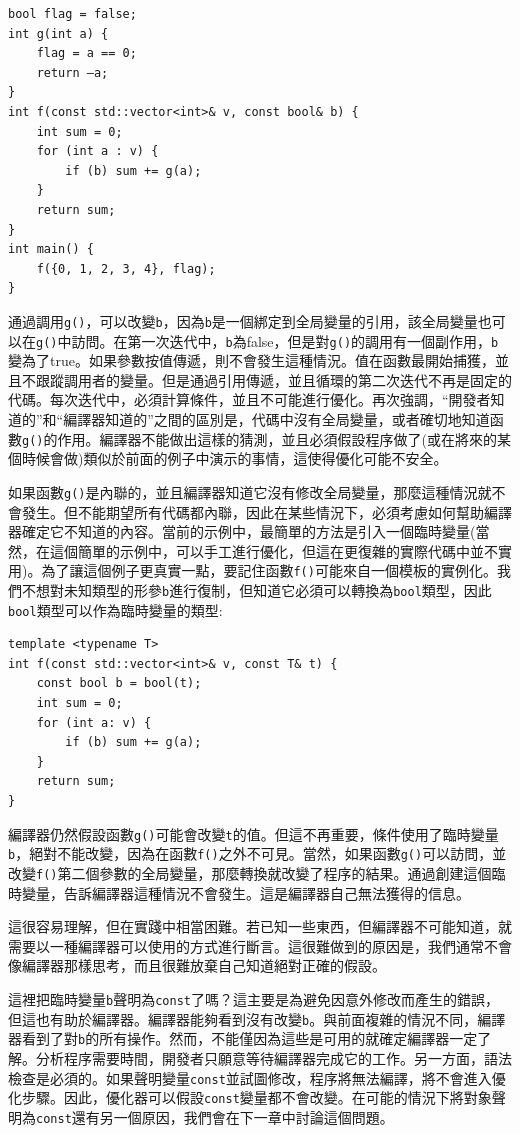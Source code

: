 \begin{lstlisting}[style=styleCXX]
bool flag = false;
int g(int a) {
	flag = a == 0;
	return –a;
}
int f(const std::vector<int>& v, const bool& b) {
	int sum = 0;
	for (int a : v) {
		if (b) sum += g(a);
	}
	return sum;
} 
int main() {
	f({0, 1, 2, 3, 4}, flag);
}
\end{lstlisting}

通過調用\texttt{g()}，可以改變\texttt{b}，因為\texttt{b}是一個綁定到全局變量的引用，該全局變量也可以在\texttt{g()}中訪問。在第一次迭代中，\texttt{b}為false，但是對\texttt{g()}的調用有一個副作用，\texttt{b}變為了true。如果參數按值傳遞，則不會發生這種情況。值在函數最開始捕獲，並且不跟蹤調用者的變量。但是通過引用傳遞，並且循環的第二次迭代不再是固定的代碼。每次迭代中，必須計算條件，並且不可能進行優化。再次強調，“開發者知道的”和“編譯器知道的”之間的區別是，代碼中沒有全局變量，或者確切地知道函數\texttt{g()}的作用。編譯器不能做出這樣的猜測，並且必須假設程序做了(或在將來的某個時候會做)類似於前面的例子中演示的事情，這使得優化可能不安全。 

如果函數\texttt{g()}是內聯的，並且編譯器知道它沒有修改全局變量，那麼這種情況就不會發生。但不能期望所有代碼都內聯，因此在某些情況下，必須考慮如何幫助編譯器確定它不知道的內容。當前的示例中，最簡單的方法是引入一個臨時變量(當然，在這個簡單的示例中，可以手工進行優化，但這在更復雜的實際代碼中並不實用)。為了讓這個例子更真實一點，要記住函數\texttt{f()}可能來自一個模板的實例化。我們不想對未知類型的形參\texttt{b}進行復制，但知道它必須可以轉換為\texttt{bool}類型，因此\texttt{bool}類型可以作為臨時變量的類型:

\begin{lstlisting}[style=styleCXX]
template <typename T>
int f(const std::vector<int>& v, const T& t) {
	const bool b = bool(t);
	int sum = 0;
	for (int a: v) {
		if (b) sum += g(a);
	}
	return sum;
}
\end{lstlisting}

編譯器仍然假設函數\texttt{g()}可能會改變\texttt{t}的值。但這不再重要，條件使用了臨時變量\texttt{b}，絕對不能改變，因為在函數\texttt{f()}之外不可見。當然，如果函數\texttt{g()}可以訪問，並改變\texttt{f()}第二個參數的全局變量，那麼轉換就改變了程序的結果。通過創建這個臨時變量，告訴編譯器這種情況不會發生。這是編譯器自己無法獲得的信息。 

這很容易理解，但在實踐中相當困難。若已知一些東西，但編譯器不可能知道，就需要以一種編譯器可以使用的方式進行斷言。這很難做到的原因是，我們通常不會像編譯器那樣思考，而且很難放棄自己知道絕對正確的假設。 

這裡把臨時變量\texttt{b}聲明為\texttt{const}了嗎？這主要是為避免因意外修改而產生的錯誤，但這也有助於編譯器。編譯器能夠看到沒有改變\texttt{b}。與前面複雜的情況不同，編譯器看到了對\texttt{b}的所有操作。然而，不能僅因為這些是可用的就確定編譯器一定了解。分析程序需要時間，開發者只願意等待編譯器完成它的工作。另一方面，語法檢查是必須的。如果聲明變量\texttt{const}並試圖修改，程序將無法編譯，將不會進入優化步驟。因此，優化器可以假設\texttt{const}變量都不會改變。在可能的情況下將對象聲明為\texttt{const}還有另一個原因，我們會在下一章中討論這個問題。 

